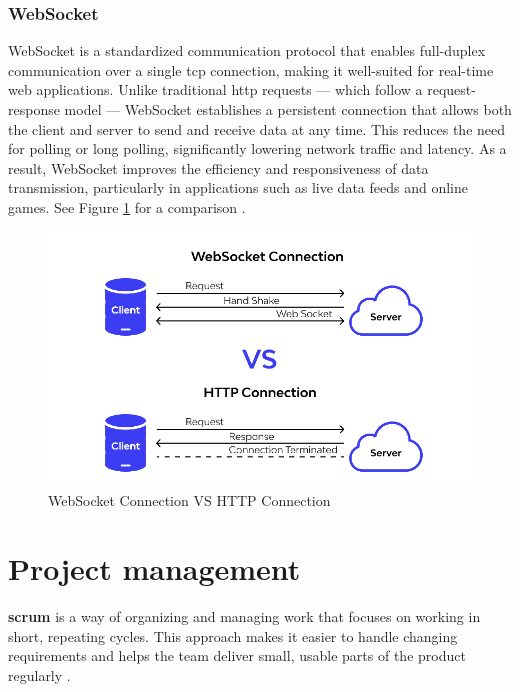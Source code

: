 {\subsubsection*{WebSocket}
\label{subsubsec:websocket}

WebSocket is a standardized communication protocol that enables full-duplex communication over a single \gls{tcp} connection, making it well-suited for real-time web applications. Unlike traditional \gls{http} requests — which follow a request-response model — WebSocket establishes a persistent connection that allows both the client and server to send and receive data at any time. This reduces the need for polling or long polling, significantly lowering network traffic and latency. As a result, WebSocket improves the efficiency and responsiveness of data transmission, particularly in applications such as live data feeds and online games. See Figure \ref{fig:websocket-vs-http} for a comparison \cite{nodejs:websocket, apidog:websocket}.


\begin{figure}[h!]
    \centering
    \includegraphics[width=0.75\linewidth]{figures/theory/websocket-vs-http.png}
    \caption[WebSocket Connection VS HTTP Connection]{WebSocket Connection VS HTTP Connection \cite{apidog:websocket}}
    \label{fig:websocket-vs-http}
\end{figure}

\section{Project management}
\label{sec:project-management}
\textbf{\gls{scrum}} is a way of organizing and managing work that focuses on working in short, repeating cycles. This approach makes it easier to handle changing requirements and helps the team deliver small, usable parts of the product regularly \cite{scrumguides:scrum}. \\

}
